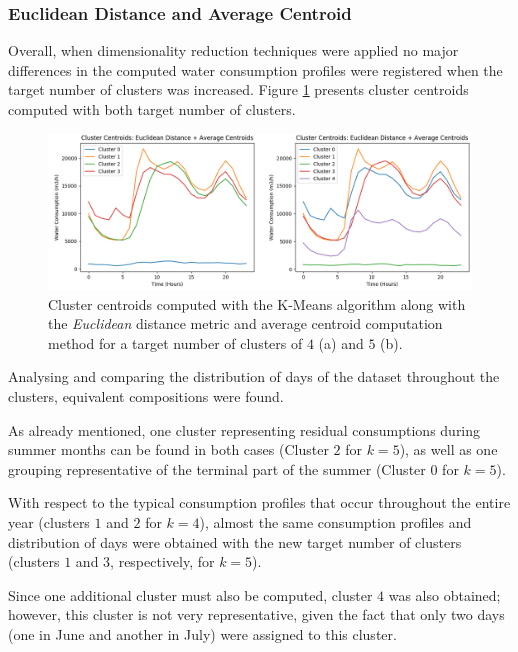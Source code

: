 \documentclass[9pt,journal,compsoc]{IEEEtran}
\begin{document}
\subsubsection{Euclidean Distance and Average Centroid}

Overall, when dimensionality reduction techniques were applied no major differences in the computed water consumption profiles were registered when the target number of clusters was increased. Figure \ref{comparison_clusters_45_average} presents cluster centroids computed with both target number of clusters.

\begin{figure}
	\centering
	\includegraphics[scale=0.4]{images/centroids_45_clusters.png}
	\caption{Cluster centroids computed with the K-Means algorithm along with the \emph{Euclidean} distance metric and average centroid computation method for a target number of clusters of $4$ (a) and $5$ (b).}
	\label{comparison_clusters_45_average}
\end{figure}

Analysing and comparing the distribution of days of the dataset throughout the clusters, equivalent compositions were found.

As already mentioned, one cluster representing residual consumptions during summer months can be found in both cases (Cluster $2$ for $k=5$), as well as one grouping representative of the terminal part of the summer (Cluster $0$ for $k=5$).

With respect to the typical consumption profiles that occur throughout the entire year (clusters $1$ and $2$ for $k=4$), almost the same consumption profiles and distribution of days were obtained with the new target number of clusters (clusters $1$ and $3$, respectively, for $k=5$).

Since one additional cluster must also be computed, cluster $4$ was also obtained; however, this cluster is not very representative, given the fact that only two days (one in June and another in July) were assigned to this cluster.
\end{document}
